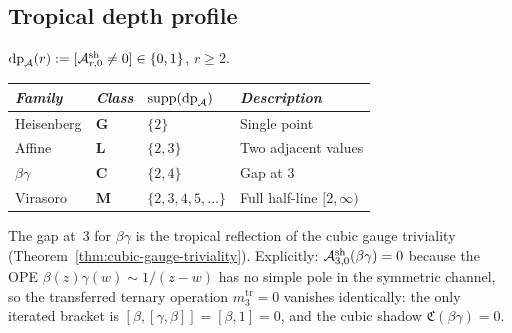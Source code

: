 
\subsection{Tropical depth profile}

\begin{definition}
$\mathrm{dp}_{\mathcal{A}}(r) := [\mathcal{A}^{\mathrm{sh}}_{r,0} \neq 0]
\in \{0,1\}$, $r \geq 2$.
\end{definition}

\begin{proposition}
\ClaimStatusProvedHere
\begin{center}
\small
\renewcommand{\arraystretch}{1.15}
\begin{tabular}{llll}
\toprule
\emph{Family} & \emph{Class} &
 $\mathrm{supp}(\mathrm{dp}_{\mathcal{A}})$ &
 \emph{Description} \\
\midrule
Heisenberg & $\mathbf{G}$ & $\{2\}$ &
 Single point \\
Affine & $\mathbf{L}$ & $\{2, 3\}$ &
 Two adjacent values \\
$\beta\gamma$ & $\mathbf{C}$ & $\{2, 4\}$ &
 Gap at $3$ \\
Virasoro & $\mathbf{M}$ & $\{2, 3, 4, 5, \ldots\}$ &
 Full half-line $[2, \infty)$ \\
\bottomrule
\end{tabular}
\end{center}
The gap at~$3$ for $\beta\gamma$ is the tropical reflection of
the cubic gauge triviality
\textup{(}Theorem~\ref{thm:cubic-gauge-triviality}\textup{)}.
Explicitly: $\mathcal{A}^{\mathrm{sh}}_{3,0}(\beta\gamma) = 0$ because
the OPE $\beta(z)\gamma(w) \sim 1/(z-w)$ has no simple pole
in the symmetric channel, so the transferred ternary operation
$m_3^{\mathrm{tr}} = 0$ vanishes identically: the only iterated
bracket is $[\beta, [\gamma, \beta]] = [\beta, 1] = 0$, and
the cubic shadow $\mathfrak{C}(\beta\gamma) = 0$.
\end{proposition}



